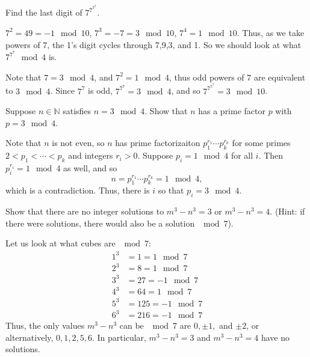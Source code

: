 \documentclass[11pt,dvipsnames]{book}
\numberwithin{equation}{section} %
\numberwithin{figure}{section} %
\numberwithin{table}{section} %
\begin{document}
\begin{exercise} Find the last digit of $7^{7^{7^{7}}}$.

\begin{solution}
$7^2=49 = -1\mod 10$, $7^3 = -7 = 3\mod 10$, $7^4 = 1 \mod 10$. Thus, as we take powers of $7$, the 1's digit cycles through 7,9,3, and 1. So we should look at what $7^{7^7}\mod 4$ is. 

Note that $7 = 3\mod 4$, and $7^2 = 1\mod 4$, thus odd powers of $7$ are equivalent to $3\mod 4$. Since $7^7$ is odd, $7^{7^7} = 3\mod 4$, and so $7^{7^{7^{7}}} = 3\mod 10$.
\end{solution}



\end{exercise}


\begin{exercise} Suppose $n\in\mathbb{N}$ satisfies $n = 3\mod 4$. Show that $n$ has a prime factor $p$ with $p = 3\mod 4$. 

\begin{solution}

Note that $n$ is not even, so $n$ has prime factorizaiton $p_{1}^{r_{1}}\cdots p_{k}^{r_{k}}$ for some primes $2<p_{1}<\cdots < p_{k}$ and integers $r_{i}>0$. Suppose $p_{i} = 1 \mod 4$ for all $i$. Then $p_{i}^{r_{i}} = 1 \mod 4$ as well, and so
\[
n=p_{1}^{r_{1}}\cdots p_{k}^{r_{k}} = 1 \mod 4,
\]
which is a contradiction. Thus, there is $i$ so that $p_{i} = 3\mod 4$.


\end{solution}

\end{exercise}

\begin{exercise}
Show that there are no integer solutions to $m^3-n^3=3$ or $m^3-n^3=4$. (Hint: if there were solutions, there would also be a solution $\mod 7$).

\begin{solution}
Let us look at what cubes are $\mod 7$:
\begin{align*}
1^3 & =1 = 1 \mod 7 \\
2^3 & =8  = 1 \mod 7\\
3^3 & =27  = -1 \mod 7 \\
4^3 & =64  = 1 \mod 7\\
5^3 & =125 = -1 \mod 7\\
6^3 & = 216  = -1 \mod 7
\end{align*}
Thus, the only values $m^3-n^3$ can be $\mod 7$ are $0,\pm 1,$ and $\pm 2$, or alternatively, $0,1,2,5,6$. In particular, $m^3-n^3=3$ and $m^3-n^3=4$ have no solutions.

\end{solution}

\end{exercise}
\end{document}
